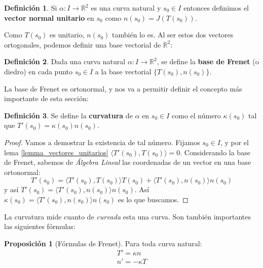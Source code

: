 \documentclass{article}
\theoremstyle{definition}
\newtheorem{prop}{Proposición}
\newtheorem{define}{Definición}
\newcommand{\reales}{\mathbb{R}}
\begin{document}
\begin{define}\label{def_curva_vector_normal1}
	Si $\alpha: I \rightarrow \reales^2$ es una curva natural y $s_0 \in I$ entonces definimos el \textbf{vector normal unitario} en $s_0$ como $n(s_0) = J(T(s_0))$.
\end{define}

Como $T(s_0)$ es unitario, $n(s_0)$ también lo es. Al ser estos dos vectores ortogonales, podemos definir una base vectorial de $\reales^2$:

\begin{define}
	Dada una curva natural $\alpha: I \rightarrow \reales^2$, se define la \textbf{base de Frenet} (o diedro) en cada punto $s_0 \in I$ a la base vectorial $\{T(s_0), n(s_0) \}$.
\end{define}

La base de Frenet es ortonormal, y nos va a permitir definir el concepto más importante de esta sección:

\begin{define}\label{def_curva_curvatura1}
	Se define la \textbf{curvatura} de $\alpha$ en $s_0 \in I$ como el número $\kappa(s_0)$ tal que $T'(s_0) = \kappa(s_0)n(s_0)$.
\end{define}

\begin{proof}
	Vamos a demostrar la existencia de tal número. Fijamos $s_0 \in I$, y por el lema \eqref{lemma_vectores_unitarios} $\langle T'(s_0), T(s_0) \rangle = 0$. Considerando la base de Frenet, sabemos de \textit{Álgebra Lineal} las coordenadas de un vector en una base ortonormal: 
	\begin{equation*}
		T'(s_0) = \langle T'(s_0), T(s_0) \rangle T(s_0) + \langle T'(s_0), n(s_0) \rangle n(s_0)
	\end{equation*}		
	y así $T'(s_0) = \langle T'(s_0), n(s_0) \rangle n(s_0)$. Así $\kappa(s_0) = \langle T'(s_0), n(s_0) \rangle n(s_0)$ es lo que buscamos.
\end{proof}

La curvatura mide cuanto de \textit{curvada} esta una curva. Son también importantes las siguientes fórmulas:

\begin{prop}[Fórmulas de Frenet]
	Para toda curva natural:
	\begin{eqnarray}
		T' = \kappa n \label{eq_frenet2d_1}\\ 
		n' = -\kappa T \label{eq_frenet2d_2}
	\end{eqnarray}
\end{prop}
\end{document}
